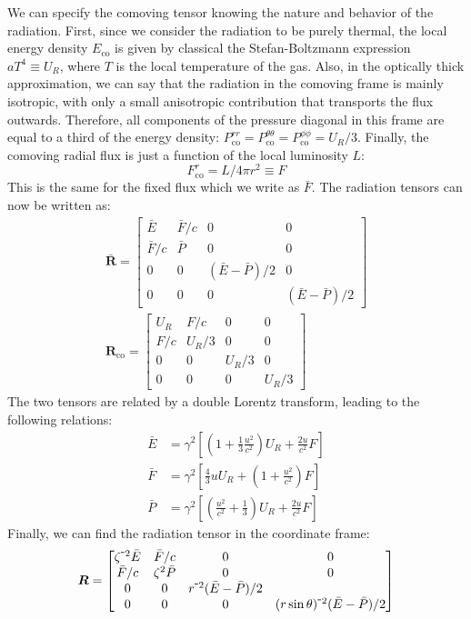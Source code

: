\documentclass[../main.tex]{subfiles}
\def\-{\raisebox{.75pt}{-}} %
\begin{document}
We can specify the comoving tensor knowing the nature and behavior of the radiation.  First, since we consider the radiation to be purely thermal, the local energy density $E_\text{co}$ is given by classical the Stefan-Boltzmann expression $aT^4\equiv U_R$, where $T$ is the local temperature of the gas.  Also, in the optically thick approximation, we can say that the radiation in the comoving frame is mainly isotropic, with only a small anisotropic contribution that transports the flux outwards.  Therefore, all components of the pressure diagonal in this frame are equal to a third of the energy density: $P^{rr}_\text{co}=P^{\theta\theta}_\text{co}=P^{\phi\phi}_\text{co}=U_R/3$. Finally, the comoving radial flux is just a function of the local luminosity $L$:
\begin{equation}
    F^r_\text{co}=L/4\pi r^2\equiv F
\end{equation}
This is the same for the fixed flux which we write as $\bar{F}$. The radiation tensors can now be written as:
\begin{gather}
\bm{\bar{R}}=\begin{bmatrix}\bar{E} & \bar{F}/c &0&0\\\bar{F}/c &\bar{P} &0&0\\0&0&(\bar{E}-\bar{P})/2&0\\0&0&0&(\bar{E}-\bar{P})/2\end{bmatrix}
\nonumber\\
\bm{R}_\text{co}=\begin{bmatrix}U_R & F/c&0&0\\F/c&U_R/3&0&0\\0&0&U_R/3&0\\0&0&0&U_R/3\end{bmatrix}
\end{gather}  
The two tensors are related by a double Lorentz transform, leading to the following relations:
\begin{align}
    \bar{E}&=\gamma^2\left[\left(1+\frac{1}{3}\frac{u^2}{c^2}\right)U_R + \frac{2u}{c^2}F\right]\label{eq:E_frametransform}\\
    \bar{F}&=\gamma^2\left[\frac{4}{3}uU_R + \left(1+\frac{u^2}{c^2}\right)F\right]\label{eq:F_frametransform}\\
    \bar{P}&=\gamma^2\left[\left(\frac{u^2}{c^2}+\frac{1}{3}\right)U_R + \frac{2u}{c^2}F\right]\label{eq:P_frametransform}
\end{align}
Finally, we can find the radiation tensor in the coordinate frame:
\begin{equation}
   \bm{R}=\begin{bmatrix}\zeta^{\-2}\bar{E}&\bar{F}/c&0&0\\\bar{F}/c&\zeta^2\bar{P}&0&0\\0&0&r^{\-2}(\bar{E}-\bar{P})/2\\0&0&0&(r\sin\theta)^{\-2}(\bar{E}-\bar{P})/2\end{bmatrix} 
\end{equation}
\end{document}
